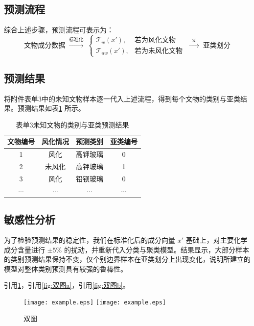 \documentclass[withoutpreface,bwprint]{cumcmthesis}
\begin{document}
\subsection{预测流程}
综合上述步骤，预测流程可表示为：
\[
\text{文物成分数据} \;\xrightarrow{\text{标准化}}\; 
\begin{cases}
\mathcal{T}_{w}(x'), & \text{若为风化文物}\\[6pt]
\mathcal{T}_{uw}(x'), & \text{若为未风化文物}
\end{cases}
\;\xrightarrow{\;\;\mathcal{K}\;\;}\; \text{亚类划分}
\]

\subsection{预测结果}
将附件表单3中的未知文物样本逐一代入上述流程，得到每个文物的类别与亚类结果。预测结果如表\ref{tab:pred} 所示。

\begin{table}[H]
\centering
\caption{表单3未知文物的类别与亚类预测结果}
\label{tab:pred}
\begin{tabular}{cccc}
\toprule
文物编号 & 风化情况 & 预测类别 & 亚类编号 \\
\midrule
1 & 风化 & 高钾玻璃 & 0 \\
2 & 未风化 & 高钾玻璃 & 1 \\
3 & 风化 & 铅钡玻璃 & 0 \\
$\cdots$ & $\cdots$ & $\cdots$ & $\cdots$ \\
\bottomrule
\end{tabular}
\end{table}

\subsection{敏感性分析}
为了检验预测结果的稳定性，我们在标准化后的成分向量 $x'$ 基础上，对主要化学成分含量进行 $\pm 5\%$ 的扰动，并重新代入分类与聚类模型。结果显示，大部分样本的类别预测结果保持不变，仅个别边界样本在亚类划分上出现变化，说明所建立的模型对整体类别预测具有较强的鲁棒性。


引用\cref{fig:双图}，引用\cref{fig:双图a}，引用\cref{fig:双图b}。

\begin{figure}[ht]
\centering
{}
{\texttt{[image: example.eps]}}
{\texttt{[image: example.eps]}}
\caption{双图}\label{fig:双图}
\end{figure} 
\end{document}
